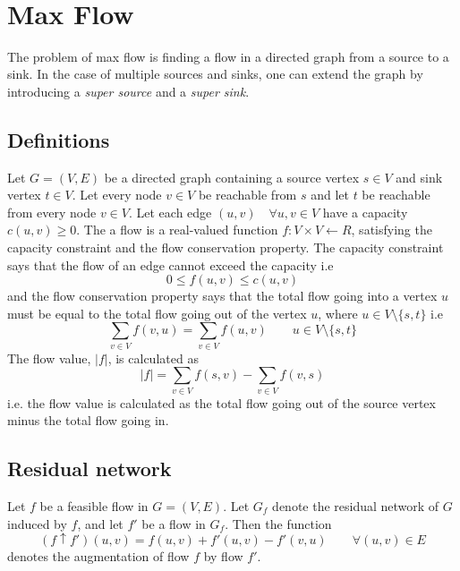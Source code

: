 \documentclass[10pt]{article}
\author{\authorName \\\texttt{\small{\authorEmail}}}
\title{\textsc{\titleName \\ \courseName}}
\begin{document}
\maketitle 

\tableofcontents

\section{Max Flow} %
\label{sec:max_flow}

The problem of max flow is finding a flow in a directed graph from a source to a sink. In the case of multiple sources and sinks, one can extend the graph by introducing a \emph{super source} and a \emph{super sink}.

\subsection{Definitions} %
\label{sub:definitions}
Let $G = (V,E)$ be a directed graph containing a source vertex $s \in V$ and sink vertex $t \in V$. Let every node $v \in V$ be reachable from $s$ and let $t$ be reachable from every node $v \in V$. Let each edge $(u,v) \quad \forall u,v \in V$ have a capacity $c(u,v) \geq 0$. The a flow is a real-valued function $f: V \times V \leftarrow R$, satisfying the capacity constraint and the flow conservation property. The capacity constraint says that the flow of an edge cannot exceed the capacity i.e
\begin{equation}
  0 \leq f(u,v) \leq c(u,v)
\end{equation} 
and the flow conservation property says that the total flow going into a vertex $u$ must be equal to the total flow going out of the vertex $u$, where $u \in V \setminus \{s,t\}$ i.e
\begin{equation}
  \sum_{v \in V} f(v,u) = \sum_{v \in V} f(u,v) \qquad u \in V \setminus \{s,t\}
\end{equation} 
The flow value, $|f|$, is calculated as
\begin{equation}
  |f| = \sum_{v \in V} f(s,v) - \sum_{v \in V} f(v,s)
\end{equation}
i.e. the flow value is calculated as the total flow going out of the source vertex minus the total flow going in.

\subsection{Residual network} %
\label{sub:residual_network}
Let $f$ be a feasible flow in $G = (V,E)$. Let $G_f$ denote the residual network of $G$ induced by $f$, and let $f'$ be a flow in $G_f$. Then the function 
\begin{equation}
  (f \uparrow f')(u,v) = f(u,v)+f'(u,v)-f'(v,u) \qquad \forall (u,v) \in E
\end{equation}
denotes the augmentation of flow $f$ by flow $f'$.
\end{document}
